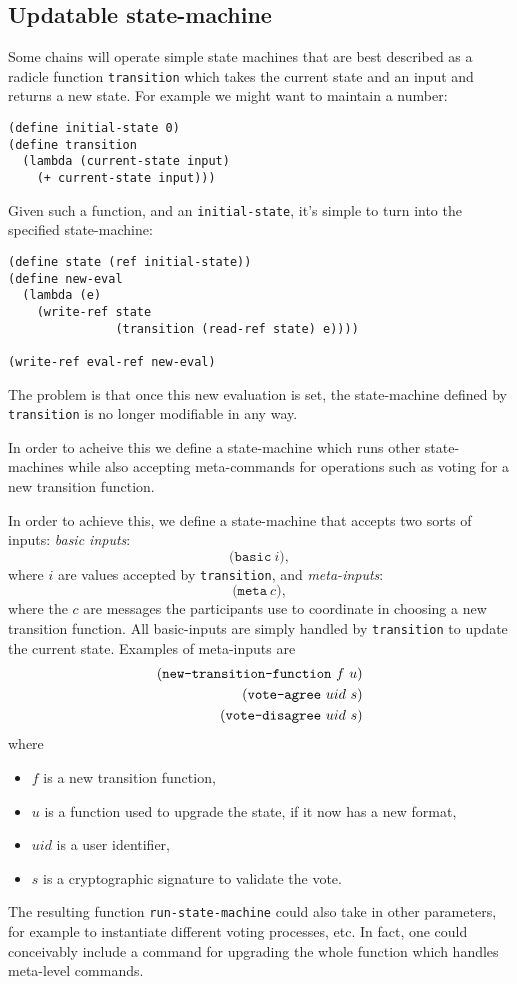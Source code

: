 \subsection{Updatable state-machine}

Some chains will operate simple state machines that are best described as a
radicle function \texttt{transition} which takes the current state and an input
and returns a new state. For example we might want to maintain a number:
\begin{lstlisting}
(define initial-state 0)
(define transition
  (lambda (current-state input)
    (+ current-state input)))
\end{lstlisting}
Given such a function, and an \texttt{initial-state}, it's simple to turn
\rads{} into the specified state-machine:
\begin{lstlisting}
(define state (ref initial-state))
(define new-eval
  (lambda (e)
    (write-ref state
               (transition (read-ref state) e))))

(write-ref eval-ref new-eval)
\end{lstlisting}

The problem is that once this new evaluation is set, the state-machine defined
by \texttt{transition} is no longer modifiable in any way.

In order to acheive this we define a state-machine which runs other
state-machines while also accepting meta-commands for operations such as voting
for a new transition function.

In order to achieve this, we define a state-machine that accepts two sorts of
inputs: \emph{basic inputs}:
\[
\mathtt{(basic} \ i),
\]
where $i$ are values accepted by \texttt{transition}, and \emph{meta-inputs}:
\[
\mathtt{(meta} \ c),
\]
where the $c$ are messages the participants use to coordinate in choosing a new
transition function. All basic-inputs are simply handled by \texttt{transition}
to update the current state. Examples of meta-inputs are
\begin{align*}
  (\text{\texttt{new-transition-function}} \ f \ u)\\
  (\text{\texttt{vote-agree}} \ uid \ s)\\
  (\text{\texttt{vote-disagree}} \ uid \ s)
\end{align*}
where
\begin{itemize}
\item $f$ is a new transition function,
\item $u$ is a function used to upgrade the state, if it now has a new format,
\item $uid$ is a user identifier,
\item $s$ is a cryptographic signature to validate the vote.
\end{itemize}
The resulting function \texttt{run-state-machine} could also take in other
parameters, for example to instantiate different voting processes, etc. In fact,
one could conceivably include a command for upgrading the whole function which
handles meta-level commands.


